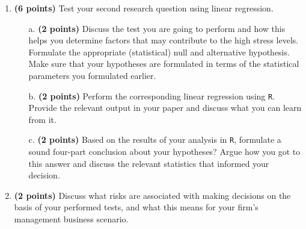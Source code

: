 {\begin{enumerate}
\begin{itemize}
        \item[a.] \textbf{(2 points)} Discuss the test you are going to perform and how this helps you determine factors that may contribute to the high stress levels. Formulate the appropriate (statistical) null and alternative hypothesis. Make sure that your hypotheses are formulated in terms of the statistical parameters you formulated earlier. 
        \item[b.] (2 points) Calculate the corresponding test statistic (e.g., $t$, $z$, $F$, $X^2$) from your data using the formulas learned in this course. Include the full calculation (including filled in formulas) in your report. You may use \texttt{R} to perform the calculations.
        \item[c.] \textbf{(2 points)} Define the critical area for your test statistic using the formulas learned in this course. Based on your previous calculations, draw a sound four-part conclusion. Argue how you got to this answer.
    \end{itemize}
    \item \textbf{(6 points)} Test your second research question using linear regression.
    \begin{itemize}
        \item[a.] \textbf{(2 points)} Discuss the test you are going to perform and how this helps you determine factors that may contribute to the high stress levels. Formulate the appropriate (statistical) null and alternative hypothesis. Make sure that your hypotheses are formulated in terms of the statistical parameters you formulated earlier.
        \item[b.] \textbf{(2 points)} Perform the corresponding linear regression using \texttt{R}. Provide the relevant output in your paper and discuss what you can learn from it. 
        \item[c.] \textbf{(2 points)} Based on the results of your analysis in \texttt{R}, formulate a sound four-part conclusion about your hypotheses? Argue how you got to this answer and discuss the relevant statistics that informed your decision. 
    \end{itemize}
    \item \textbf{(2 points)} Discuss what risks are associated with making decisions on the basis of your performed tests, and what this means for your firm’s management business scenario.
\end{enumerate}

}
\clearpage %